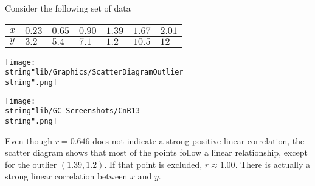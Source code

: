 \documentclass[11pt,a4paper]{book}
\begin{document}
Consider the following set of data
\begin{center}
\setlength{\extrarowheight}{2pt}%
\begin{tabular}{|>{\centering}p{1cm}|>{\centering}p{1cm}|>{\centering}p{1cm}|>{\centering}p{1cm}|>{\centering}p{1cm}|>{\centering}p{1cm}|>{\centering}p{1cm}|}
\hline
$x$ & $0.23$ & $0.65$ & $0.90$ & $1.39$ & $1.67$ & $2.01$\tabularnewline
\hline
$y$ & $3.2$ & $5.4$ & $7.1$ & $1.2$ & $10.5$ & $12$\tabularnewline
\hline
\end{tabular}
\par\end{center}

\begin{minipage}[t]{.5\textwidth}
\begin{center}
\texttt{[image: \\string"lib/Graphics/ScatterDiagramOutlier\\string".png]}
\par\end{center}

\end{minipage}
\begin{minipage}[t]{.5\textwidth}
\begin{center}
\texttt{[image: \\string"lib/GC Screenshots/CnR13\\string".png]}
\par\end{center}

Even though $r=0.646$ does not indicate a strong positive linear
correlation, the scatter diagram shows that most of the points follow
a linear relationship, except for the outlier $\left(1.39,1.2\right)$.
If that point is excluded, $r\approx1.00$. There is actually a strong
linear correlation between $x$ and $y$.

\end{minipage}

\newpage
\end{document}
